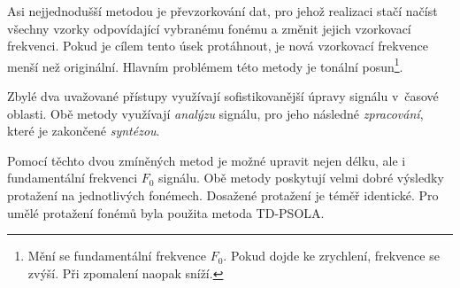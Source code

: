 \noindent Asi nejjednodušší metodou je převzorkování dat, pro jehož realizaci stačí načíst všechny vzorky odpovídající vybranému fonému a změnit jejich vzorkovací frekvenci.
Pokud je cílem tento úsek protáhnout, je nová vzorkovací frekvence menší než originální.
Hlavním problémem této metody je tonální posun\footnote{Mění se fundamentální frekvence $F_0$. Pokud dojde ke zrychlení, frekvence se zvýší. Při zpomalení naopak sníží.}.

Zbylé dva uvažované přístupy využívají sofistikovanější úpravy signálu v~časové oblasti.
Obě metody využívají \textit{analýzu} signálu, pro jeho následné \textit{zpracování}, které je zakončené \textit{syntézou}.


Pomocí těchto dvou zmíněných metod je možné upravit nejen délku, ale i  fundamentální frekvenci $F_0$ signálu.
Obě metody poskytují velmi dobré výsledky protažení na jednotlivých fonémech.
Dosažené protažení je téměř identické.
Pro umělé protažení fonémů byla použita metoda TD-PSOLA.


